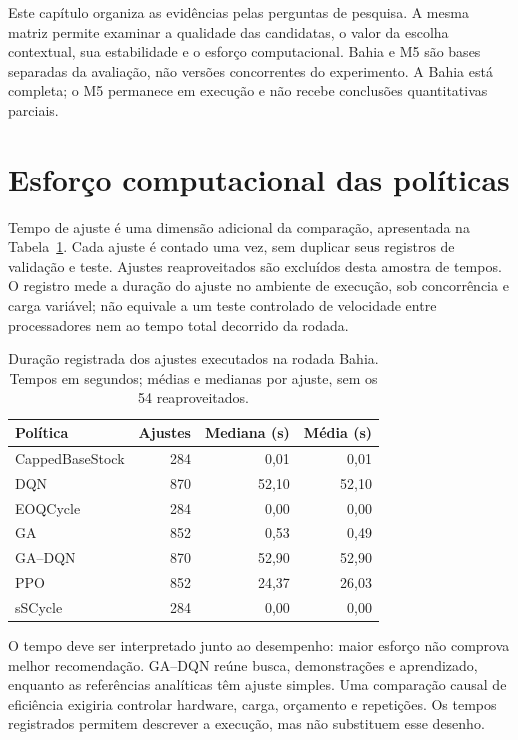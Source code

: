 
Este capítulo organiza as evidências pelas perguntas de pesquisa. A mesma matriz permite examinar a qualidade das candidatas, o valor da escolha contextual, sua estabilidade e o esforço computacional. Bahia e M5 são bases separadas da avaliação, não versões concorrentes do experimento. A Bahia está completa; o M5 permanece em execução e não recebe conclusões quantitativas parciais.



\section{Esforço computacional das políticas}
\label{sec:computational_results}

Tempo de ajuste é uma dimensão adicional da comparação, apresentada na Tabela~\ref{tab:fit_time}. Cada ajuste é contado uma vez, sem duplicar seus registros de validação e teste. Ajustes reaproveitados são excluídos desta amostra de tempos. O registro mede a duração do ajuste no ambiente de execução, sob concorrência e carga variável; não equivale a um teste controlado de velocidade entre processadores nem ao tempo total decorrido da rodada.

\begin{table}[htbp]\centering\small
\caption{Duração registrada dos ajustes executados na rodada Bahia. Tempos em segundos; médias e medianas por ajuste, sem os 54 reaproveitados.}
\label{tab:fit_time}
\begin{tabular}{@{}lrrr@{}}\toprule
Política & Ajustes & Mediana (s) & Média (s)\\\midrule
CappedBaseStock & 284 & 0,01 & 0,01\\
DQN & 870 & 52,10 & 52,10\\
EOQCycle & 284 & 0,00 & 0,00\\
GA & 852 & 0,53 & 0,49\\
GA--DQN & 870 & 52,90 & 52,90\\
PPO & 852 & 24,37 & 26,03\\
sSCycle & 284 & 0,00 & 0,00\\
\bottomrule\end{tabular}\end{table}

O tempo deve ser interpretado junto ao desempenho: maior esforço não comprova melhor recomendação. GA--DQN reúne busca, demonstrações e aprendizado, enquanto as referências analíticas têm ajuste simples. Uma comparação causal de eficiência exigiria controlar hardware, carga, orçamento e repetições. Os tempos registrados permitem descrever a execução, mas não substituem esse desenho.

